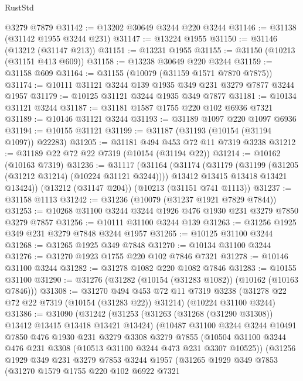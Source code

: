 \begin{lexlean}{RustStd}
\begin{coremodule}
{\begin{coremodule}
{{{{{{{{{{{{{{{{{{{{{{{{{{    @3279
    @7879
@31142 := @13202 @30649 @3244 @220 @3244
@31146 := @31138 (@31142 @1955 @3244 @231)
@31147 := @13224 @1955
@31150 := @31146 (@13212 (@31147 @213))
@31151 := @13231 @1955
@31155 := @31150 (@10213 (@31151 @413 @609))
@31158 := @13238 @30649 @220 @3244
@31159 := @31158 @609
@31164 := @31155 (@10079 (@31159 @1571 @7870 @7875))
@31174 := @10111 @31121 @3244 @139 @1935 @349 @231 @3279 @7877 @3244 @1957
@31179 := @10125 @31121 @3244 @1935 @349 @7877
@31181 := @10134 @31121 @3244
@31187 := @31181 @1587 @1755 @220 @102 @6936 @7321
@31189 := @10146 @31121 @3244
@31193 := @31189 @1097 @220 @1097 @6936
@31194 := @10155 @31121
@31199 := @31187 (@31193 (@10154 (@31194 @1097)) @22283)
@31205 := @31181 @494 @453 @72 @11 @7319 @3238
@31212 := @31189 @22 @72 @22 @7319 (@10154 (@31194 @22))
@31214 := @10162 (@10163 @7319)
@31236 := @31117
    (@31164
      (@31174
        (@31179 (@31199 (@31205 (@31212 @31214) (@10224 @31121 @3244))))
        @13412
        @13415
        @13418
        @13421
        @13424))
    (@13212 (@31147 @204))
    (@10213 (@31151 @741 @1113))
@31237 := @31158 @1113
@31242 := @31236 (@10079 (@31237 @1921 @7829 @7844))
@31253 := @10268 @31100 @3244 @3244 @1926 @476 @1930 @231 @3279 @7850 @3279 @7857
@31256 := @10111 @31100 @3244 @139
@31263 := @31256 @1925 @349 @231 @3279 @7848 @3244 @1957
@31265 := @10125 @31100 @3244
@31268 := @31265 @1925 @349 @7848
@31270 := @10134 @31100 @3244
@31276 := @31270 @1923 @1755 @220 @102 @7846 @7321
@31278 := @10146 @31100 @3244
@31282 := @31278 @1082 @220 @1082 @7846
@31283 := @10155 @31100
@31290 := @31276 (@31282 (@10154 (@31283 @1082)) (@10162 (@10163 @7846)))
@31308 := @31270
    @494
    @453
    @72
    @11
    @7319
    @3238
    (@31278 @22 @72 @22 @7319 (@10154 (@31283 @22)) @31214)
    (@10224 @31100 @3244)
@31386 := @31090
    (@31242
      (@31253
        (@31263 (@31268 (@31290 @31308)) @13412 @13415 @13418 @13421 @13424)
        (@10487
          @31100
          @3244
          @3244
          @10491
          @7850
          @476
          @1930
          @231
          @3279
          @3308
          @3279
          @7855
          (@10504 @31100 @3244 @476 @231 @3308 (@10513 @31100 @3244 @473 @231 @3307 @10525))
          (@31256
            @1929
            @349
            @231
            @3279
            @7853
            @3244
            @1957
            (@31265
              @1929
              @349
              @7853
              (@31270
                @1579
                @1755
                @220
                @102
                @6922
                @7321
}}}}}}}}}}}}}}}}}}}}}}}}}}
\end{coremodule}}
\end{coremodule}
\end{lexlean}
